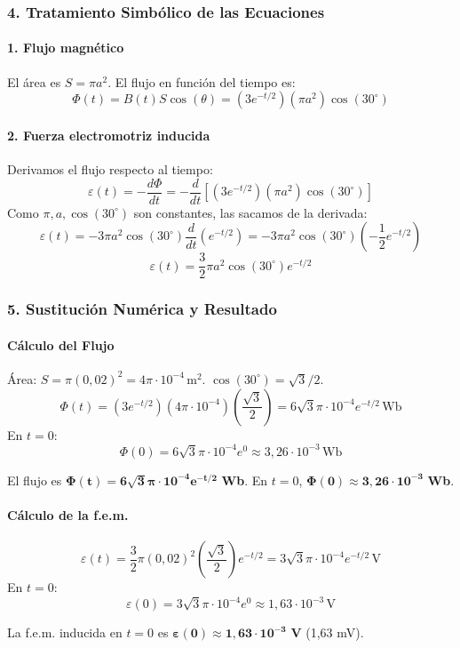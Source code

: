 \subsubsection*{4. Tratamiento Simbólico de las Ecuaciones}
\paragraph*{1. Flujo magnético}
El área es $S = \pi a^2$. El flujo en función del tiempo es:
$$\Phi(t) = B(t) S \cos(\theta) = (3e^{-t/2})(\pi a^2)\cos(30^\circ)$$
\paragraph*{2. Fuerza electromotriz inducida}
Derivamos el flujo respecto al tiempo:
$$\varepsilon(t) = -\frac{d\Phi}{dt} = - \frac{d}{dt} \left[ (3e^{-t/2})(\pi a^2)\cos(30^\circ) \right]$$
Como $\pi, a, \cos(30^\circ)$ son constantes, las sacamos de la derivada:
$$\varepsilon(t) = -3\pi a^2 \cos(30^\circ) \frac{d}{dt}(e^{-t/2}) = -3\pi a^2 \cos(30^\circ) \left(-\frac{1}{2}e^{-t/2}\right)$$
$$\varepsilon(t) = \frac{3}{2}\pi a^2 \cos(30^\circ) e^{-t/2}$$

\subsubsection*{5. Sustitución Numérica y Resultado}
\paragraph*{Cálculo del Flujo}
Área: $S = \pi (0,02)^2 = 4\pi \cdot 10^{-4} \, \text{m}^2$.
$\cos(30^\circ) = \sqrt{3}/2$.
$$\Phi(t) = (3e^{-t/2})(4\pi \cdot 10^{-4})(\frac{\sqrt{3}}{2}) = 6\sqrt{3}\pi \cdot 10^{-4} e^{-t/2} \, \text{Wb}$$
En $t=0$:
$$\Phi(0) = 6\sqrt{3}\pi \cdot 10^{-4} e^0 \approx 3,26 \cdot 10^{-3} \, \text{Wb}$$
\begin{cajaresultado}
    El flujo es $\boldsymbol{\Phi(t) = 6\sqrt{3}\pi \cdot 10^{-4} e^{-t/2}}$ \textbf{Wb}. En $t=0$, $\boldsymbol{\Phi(0) \approx 3,26 \cdot 10^{-3}}$ \textbf{Wb}.
\end{cajaresultado}

\paragraph*{Cálculo de la f.e.m.}
$$\varepsilon(t) = \frac{3}{2}\pi (0,02)^2 (\frac{\sqrt{3}}{2}) e^{-t/2} = 3\sqrt{3}\pi \cdot 10^{-4} e^{-t/2} \, \text{V}$$
En $t=0$:
$$\varepsilon(0) = 3\sqrt{3}\pi \cdot 10^{-4} e^0 \approx 1,63 \cdot 10^{-3} \, \text{V}$$
\begin{cajaresultado}
    La f.e.m. inducida en $t=0$ es $\boldsymbol{\varepsilon(0) \approx 1,63 \cdot 10^{-3}}$ \textbf{V} (1,63 mV).
\end{cajaresultado}

